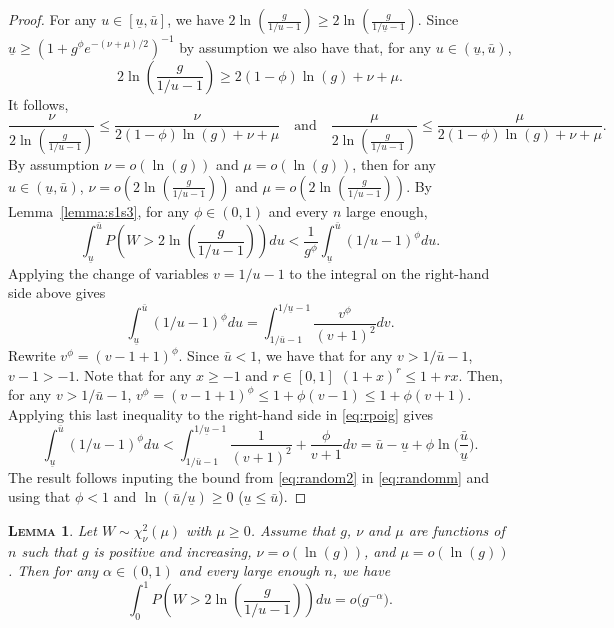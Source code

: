 \documentclass[bj,authoryear]{imsart}
\theoremstyle{plain}
\newtheorem{lem}[thm]{\textsc{Lemma}}
\begin{document}
\begin{proof}
For any $u\in [\underline{u},\bar{u}]$, we have $2\ln \left(\frac{g}{1 / u-1}\right) \geq 2\ln \left(\frac{g}{1 / \underline{u}-1}\right)$. Since $\underline{u}\geq (1+g^{\phi}e^{-(\nu+\mu)/2})^{-1}$ by assumption  we also have that, for any $u\in (\underline{u},\bar{u})$,
$$2\ln \left(\frac{g}{1 / u-1}\right) \geq 2(1-\phi)\ln(g)+\nu+\mu.$$
It follows,
$$\frac{\nu}{2\ln \left(\frac{g}{1 / u-1}\right)}\leq \frac{\nu}{2(1-\phi)\ln(g)+\nu+\mu}
\quad\text{and}\quad
\frac{\mu}{2\ln \left(\frac{g}{1 / u-1}\right)}\leq\frac{\mu}{ 2(1-\phi)\ln(g)+\nu+\mu}.$$
By assumption $\nu=o\left(\ln (g)\right)$ and $\mu=o\left(\ln (g)\right)$, then for any $u\in (\underline{u},\bar{u})$, $\nu=o\left(2\ln \left(\frac{g}{1 / u-1}\right)\right)$ and $\mu=o\left(2\ln \left(\frac{g}{1 / u-1}\right)\right)$. By Lemma~\ref{lemma:s1s3}, for any $\phi\in(0,1)$ and every $n$ large enough,
\begin{equation}\label{eq:randomm}
    \int_{\underline{u}}^{\bar{u}} P\left(W>2\ln \left(\frac{g}{1 / u-1}\right)\right) d u< \frac{1}{g^{\phi}} \int_{\underline{u}}^{\bar{u}}(1 / u-1)^{\phi} d u .
\end{equation}
Applying the change of variables $v=1 / u-1$ to the integral on the right-hand side above gives
\begin{equation}\label{eq:rpoig}
    \int_{\underline{u}}^{\bar{u}}(1 / u-1)^{\phi} d u=\int_{1 / \bar{u}-1}^{1 / \underline{u}-1} \frac{v^{\phi}}{(v+1)^2} d v.
\end{equation}
Rewrite $v^{\phi}=(v-1 + 1)^{\phi}$. Since $\bar{u}<1$, we have that for any $v>1 / \bar{u}-1$, $v-1>-1$. Note that for any $x \geq-1$ and $r\in[0,1]$ $(1+x)^r \leq 1+r x$. Then, for any $v>1 / \bar{u}-1$, $v^{\phi}=(v-1 + 1)^{\phi}\leq 1 + \phi (v-1)\leq 1 + \phi(v+1)$. Applying this last inequality to the right-hand side in \eqref{eq:rpoig} gives
\begin{equation}\label{eq:random2}
\int_{\underline{u}}^{\bar{u}}(1 / u-1)^{\phi} d u<\int_{1 / \bar{u}-1}^{1 / \underline{u}-1} \frac{1}{(v+1)^2} +\frac{\phi}{v+1} d v = \bar{u}-\underline{u}+\phi\ln\Big(\frac{\bar{u}}{\underline{u}}\Big).
\end{equation}
The result follows inputing the bound from \eqref{eq:random2} in \eqref{eq:randomm} and using that $\phi<1$ and $\ln(\bar{u}/\underline{u}) \geq 0$ ($\underline{u} \leq \bar{u}$).
\end{proof}

\begin{lem}\label{lemma:s20}
 Let $W\sim \chi_\nu^2(\mu)$ with $\mu \geq 0$. Assume that $g$, $\nu$ and $\mu$ are functions of $n$ such that $g$ is positive and increasing,  $\nu=o(\ln(g))$, and $\mu=o(\ln(g))$. Then for any $\alpha\in(0,1)$ and every large enough $n$, we have
$$
\int_0^1 P\left(W>2 \ln \left(\frac{g}{1 / u-1}\right)\right) d u = o\big(  g^{-\alpha}\big).$$
\end{lem}
\end{document}
